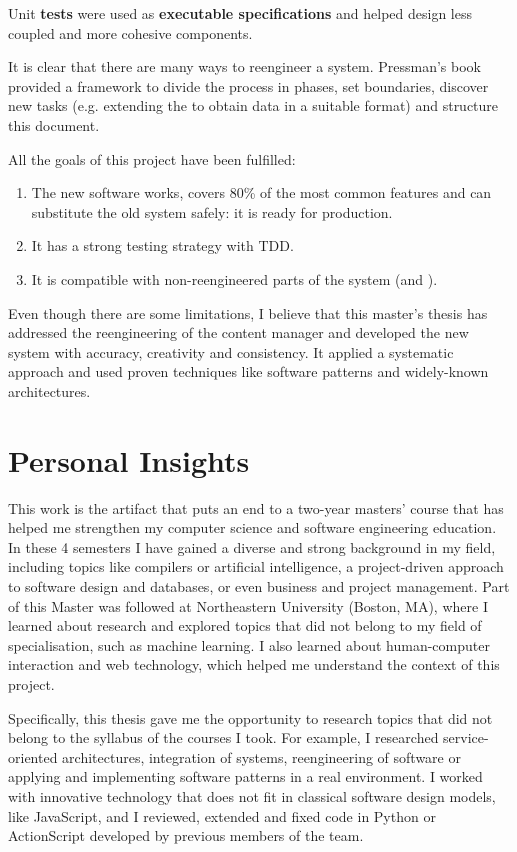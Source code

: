 Unit \textbf{tests} were used as \textbf{executable specifications} and helped design less coupled and more cohesive components.

It is clear that there are many ways to reengineer a system.
Pressman's book provided a framework to divide the process in phases, set boundaries, discover new tasks (e.g. extending the \flangobe to obtain data in a suitable format) and structure this document.

All the goals of this project have been fulfilled:
\begin{enumerate}
\item The new software works, covers 80\% of the most common features and can substitute the old \flash system safely: it is ready for production.
\item It has a strong testing strategy with \ac{TDD}.
\item It is compatible with non-reengineered parts of the system (\flangobe and \flangofe).
\end{enumerate}

Even though there are some limitations, I believe that this master's thesis has addressed the reengineering of the content manager and developed the new system with accuracy, creativity and consistency. It applied a systematic approach and used proven techniques like software patterns and widely-known architectures.


\section{Personal Insights}
This work is the artifact that puts an end to a two-year masters' course that has helped me strengthen my computer science and software engineering education.
In these 4 semesters I have gained a diverse and strong background in my field, including topics like compilers or artificial intelligence, a project-driven approach to software design and databases, or even business and project management.
Part of this Master was followed at Northeastern University (Boston, MA), where I learned about research and explored topics that did not belong to my field of specialisation, such as machine learning.
I also learned about human-computer interaction and web technology, which helped me understand the context of this project.

Specifically, this thesis gave me the opportunity to research topics that did not belong to the syllabus of the courses I took.
For example, I researched service-oriented architectures, integration of systems, reengineering of software or applying and implementing software patterns in a real environment.
I worked with innovative technology that does not fit in classical software design models, like JavaScript, and I reviewed, extended and fixed code in Python or ActionScript developed by previous members of the team.

